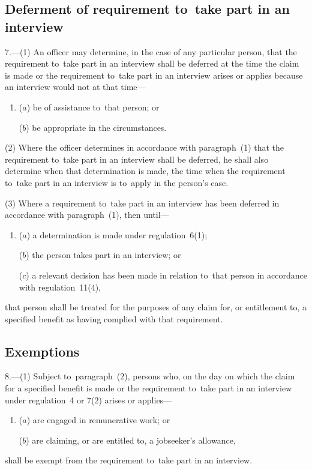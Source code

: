 \documentclass[12pt,a4paper]{article}
\begin{document}
\subsection[7. Deferment of requirement to~take part in an interview]{Deferment of requirement to~take part in an interview}

7.---(1)  An officer may determine, in the case of any particular person, that the requirement to~take part in an interview shall be deferred at the time the claim is made or the requirement to~take part in an interview arises or applies because an interview would not at that time—
\begin{enumerate}\item[]
($a$) be of assistance to~that person; or

($b$) be appropriate in the circumstances.
\end{enumerate}

(2) Where the officer determines in accordance with paragraph~(1) that the requirement to~take part in an interview shall be deferred, he shall also determine when that determination is made, the time when the requirement to~take part in an interview is to~apply in the person’s case.

(3) Where a requirement to~take part in an interview has been deferred in accordance with paragraph~(1), then until—
\begin{enumerate}\item[]
($a$) a determination is made under regulation~6(1);

($b$) the person takes part in an interview; or

($c$) a relevant decision has been made in relation to~that person in accordance with regulation~11(4),
\end{enumerate}
that person shall be treated for the purposes of any claim for, or entitlement to, a specified benefit as having complied with that requirement.

\subsection[8. Exemptions]{Exemptions}

8.---(1)  Subject to~paragraph~(2), persons who, on the day on which the claim for a specified benefit is made or the requirement to~take part in an interview under regulation~4 or 7(2) arises or applies—
\begin{enumerate}\item[]
($a$) are engaged in remunerative work; or

\enlargethispage{-\baselineskip}

($b$) are claiming, or are entitled to, a jobseeker’s allowance,
\end{enumerate}
shall be exempt from the requirement to~take part in an interview.
\end{document}
